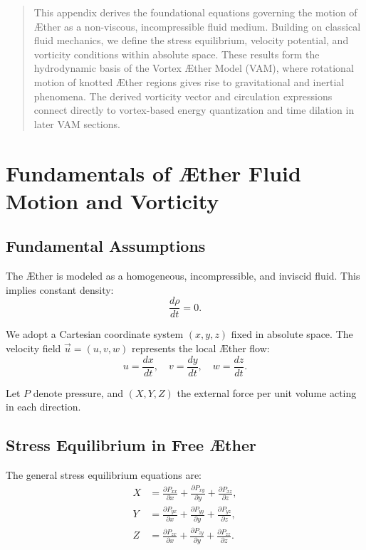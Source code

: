 \documentclass[12pt]{article}
\begin{document}
    \titlepageOpen

    \begin{abstract}
        This appendix derives the foundational equations governing the motion of Æther as a non-viscous, incompressible fluid medium. Building on classical fluid mechanics, we define the stress equilibrium, velocity potential, and vorticity conditions within absolute space. These results form the hydrodynamic basis of the Vortex Æther Model (VAM), where rotational motion of knotted Æther regions gives rise to gravitational and inertial phenomena. The derived vorticity vector and circulation expressions connect directly to vortex-based energy quantization and time dilation in later VAM sections.
    \end{abstract}

    \titlepageClose
    \fi

    \section{Fundamentals of Æther Fluid Motion and Vorticity}

    \subsection{Fundamental Assumptions}
    The Æther is modeled as a homogeneous, incompressible, and inviscid fluid. This implies constant density:
    \begin{equation}
        \frac{d \rho}{d t} = 0.
    \end{equation}

    We adopt a Cartesian coordinate system \((x, y, z)\) fixed in absolute space. The velocity field \(\vec{u} = (u, v, w)\) represents the local Æther flow:
    \begin{equation}
        u = \frac{dx}{dt}, \quad v = \frac{dy}{dt}, \quad w = \frac{dz}{dt}.
    \end{equation}

    Let \(P\) denote pressure, and \((X, Y, Z)\) the external force per unit volume acting in each direction.

    \subsection{Stress Equilibrium in Free Æther}
    The general stress equilibrium equations are:
    \begin{align}
        X &= \frac{\partial P_{xx}}{\partial x} + \frac{\partial P_{xy}}{\partial y} + \frac{\partial P_{xz}}{\partial z}, \\
        Y &= \frac{\partial P_{yx}}{\partial x} + \frac{\partial P_{yy}}{\partial y} + \frac{\partial P_{yz}}{\partial z}, \\
        Z &= \frac{\partial P_{zx}}{\partial x} + \frac{\partial P_{zy}}{\partial y} + \frac{\partial P_{zz}}{\partial z}.
    \end{align}
\end{document}
